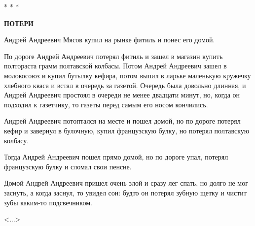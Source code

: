 \begin{center}
    * * *
\end{center}

\begin{center}
    \textbf{ПОТЕРИ}
\end{center}

    Андрей  Андреевич  Мясов купил на  рынке
фитиль и понес его домой.

    По дороге Андрей Андреевич  потерял  
фитиль  и  зашел  в  магазин купить полтораста
грамм полтавской колбасы. Потом Андрей  
Андреевич зашел  в  молокосоюз  и купил бутылку
кефира, потом выпил в ларьке  маленькую 
кружечку хлебного  кваса  и встал  в очередь за
газетой.  Очередь была довольно  длинная,  и
Андрей Андреевич простоял в очереди не менее
двадцати минут, но, когда он  подходил к 
газетчику,  то  газеты перед самым  его  носом
кончились.

    Андрей  Андреевич  потоптался на месте и
пошел домой,  но по дороге потерял  кефир  и
завернул в булочную, купил французскую  
булку, но потерял полтавскую колбасу.

    Тогда  Андрей Андреевич пошел прямо  
домой, но по дороге упал, потерял  французскую
булку и сломал свои пенсне.

    Домой Андрей Андреевич пришел очень злой
и сразу лег спать,  но долго не мог заснуть,
а когда заснул, то увидел сон: будто он  
потерял  зубную  щетку и чистит  зубы каким-то
подсвечником.

\begin{flushright}
    <...>
\end{flushright}